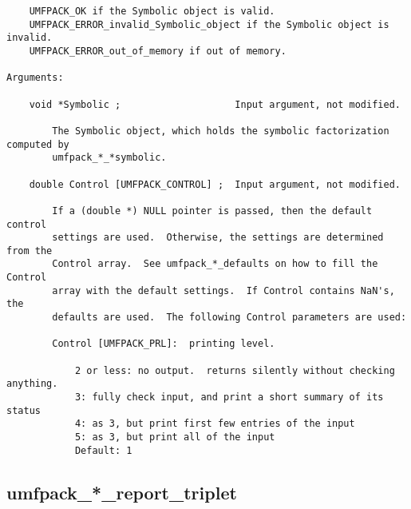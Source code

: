 {\begin{verbatim}
    UMFPACK_OK if the Symbolic object is valid.
    UMFPACK_ERROR_invalid_Symbolic_object if the Symbolic object is invalid.
    UMFPACK_ERROR_out_of_memory if out of memory.

Arguments:

    void *Symbolic ;                    Input argument, not modified.

        The Symbolic object, which holds the symbolic factorization computed by
        umfpack_*_*symbolic.

    double Control [UMFPACK_CONTROL] ;  Input argument, not modified.

        If a (double *) NULL pointer is passed, then the default control
        settings are used.  Otherwise, the settings are determined from the
        Control array.  See umfpack_*_defaults on how to fill the Control
        array with the default settings.  If Control contains NaN's, the
        defaults are used.  The following Control parameters are used:

        Control [UMFPACK_PRL]:  printing level.

            2 or less: no output.  returns silently without checking anything.
            3: fully check input, and print a short summary of its status
            4: as 3, but print first few entries of the input
            5: as 3, but print all of the input
            Default: 1
\end{verbatim}
}

\newpage
\subsection{umfpack\_*\_report\_triplet}

